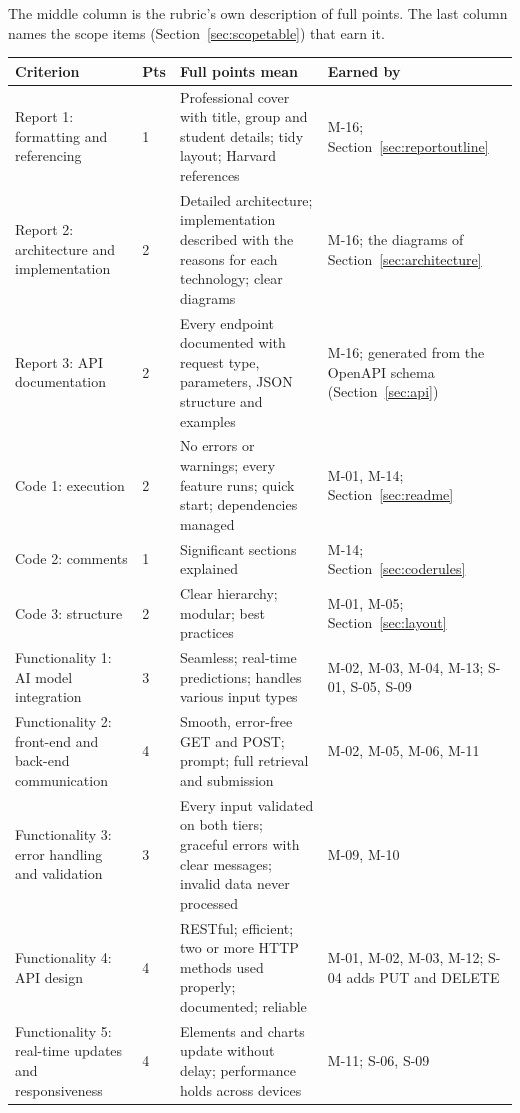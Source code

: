 The middle column is the rubric's own description of full points. The last column names the scope
items (Section~\ref{sec:scopetable}) that earn it.

{\small
\begin{longtable}{@{}L{3.3cm}C{0.7cm}L{5.6cm}L{4.4cm}@{}}
\toprule
\textbf{Criterion} & \textbf{Pts} & \textbf{Full points mean} & \textbf{Earned by} \\
\midrule
\endhead
Report 1: formatting and referencing & 1 & Professional cover with title, group and student details; tidy layout; Harvard references & M-16; Section~\ref{sec:reportoutline} \\
Report 2: architecture and implementation & 2 & Detailed architecture; implementation described with the reasons for each technology; clear diagrams & M-16; the diagrams of Section~\ref{sec:architecture} \\
Report 3: API documentation & 2 & Every endpoint documented with request type, parameters, JSON structure and examples & M-16; generated from the OpenAPI schema (Section~\ref{sec:api}) \\
Code 1: execution & 2 & No errors or warnings; every feature runs; quick start; dependencies managed & M-01, M-14; Section~\ref{sec:readme} \\
Code 2: comments & 1 & Significant sections explained & M-14; Section~\ref{sec:coderules} \\
Code 3: structure & 2 & Clear hierarchy; modular; best practices & M-01, M-05; Section~\ref{sec:layout} \\
Functionality 1: AI model integration & 3 & Seamless; real-time predictions; handles various input types & M-02, M-03, M-04, M-13; S-01, S-05, S-09 \\
Functionality 2: front-end and back-end communication & 4 & Smooth, error-free GET and POST; prompt; full retrieval and submission & M-02, M-05, M-06, M-11 \\
Functionality 3: error handling and validation & 3 & Every input validated on both tiers; graceful errors with clear messages; invalid data never processed & M-09, M-10 \\
Functionality 4: API design & 4 & RESTful; efficient; two or more HTTP methods used properly; documented; reliable & M-01, M-02, M-03, M-12; S-04 adds PUT and DELETE \\
Functionality 5: real-time updates and responsiveness & 4 & Elements and charts update without delay; performance holds across devices & M-11; S-06, S-09 \\

\end{longtable}}
